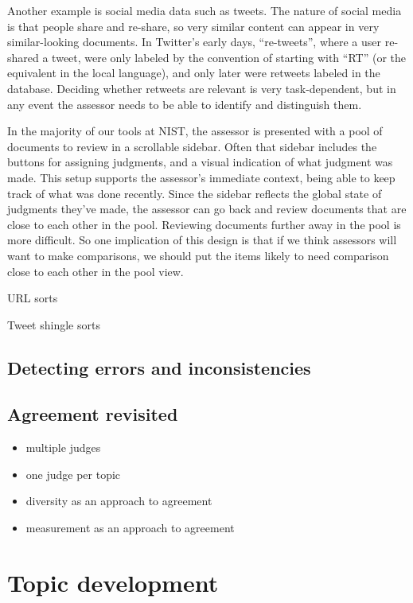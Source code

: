 \documentclass[nobib]{tufte-book}
\begin{document}
Another example is social media data such as tweets.  The nature of social media is that people share and re-share, so very similar content can appear in very similar-looking documents.  In Twitter's early days, ``re-tweets'', where a user re-shared a tweet, were only labeled by the convention of starting with ``RT'' (or the equivalent in the local language), and only later were retweets labeled in the database.  Deciding whether retweets are relevant is very task-dependent, but in any event the assessor needs to be able to identify and distinguish them.

In the majority of our tools at NIST, the assessor is presented with a pool of documents to review in a scrollable sidebar.  Often that sidebar includes the buttons for assigning judgments, and a visual indication of what judgment was made.  This setup supports the assessor's immediate context, being able to keep track of what was done recently.  Since the sidebar reflects the global state of judgments they've made, the assessor can go back and review documents that are close to each other in the pool.  Reviewing documents further away in the pool is more difficult.  So one implication of this design is that if we think assessors will want to make comparisons, we should put the items likely to need comparison close to each other in the pool view.

URL sorts

Tweet shingle sorts


\section{Detecting errors and inconsistencies}
\section{Agreement revisited}
\begin{itemize}
\item multiple judges
\item one judge per topic
\item diversity as an approach to agreement
\item measurement as an approach to agreement
\end{itemize}

\chapter{Topic development} \label{topic-development}
\end{document}
